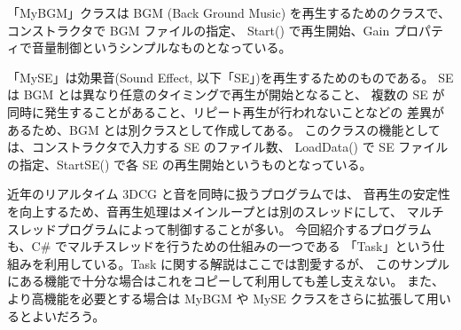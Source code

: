「MyBGM」クラスは BGM (Back Ground Music) を再生するためのクラスで、
コンストラクタで BGM ファイルの指定、
Start() で再生開始、Gain プロパティで音量制御というシンプルなものとなっている。

「MySE」は効果音(Sound Effect, 以下「SE」)を再生するためのものである。
SE は BGM とは異なり任意のタイミングで再生が開始となること、
複数の SE が同時に発生することがあること、リピート再生が行われないことなどの
差異があるため、BGM とは別クラスとして作成してある。
このクラスの機能としては、コンストラクタで入力する SE のファイル数、
LoadData() で SE ファイルの指定、StartSE() で各 SE の再生開始というものとなっている。

近年のリアルタイム 3DCG と音を同時に扱うプログラムでは、
音再生の安定性を向上するため、音再生処理はメインループとは別のスレッドにして、
マルチスレッドプログラムによって制御することが多い。
今回紹介するプログラムも、C\# でマルチスレッドを行うための仕組みの一つである
「Task」という仕組みを利用している。Task に関する解説はここでは割愛するが、
このサンプルにある機能で十分な場合はこれをコピーして利用しても差し支えない。
また、より高機能を必要とする場合は MyBGM や MySE クラスをさらに拡張して用いるとよいだろう。
\\ ~

